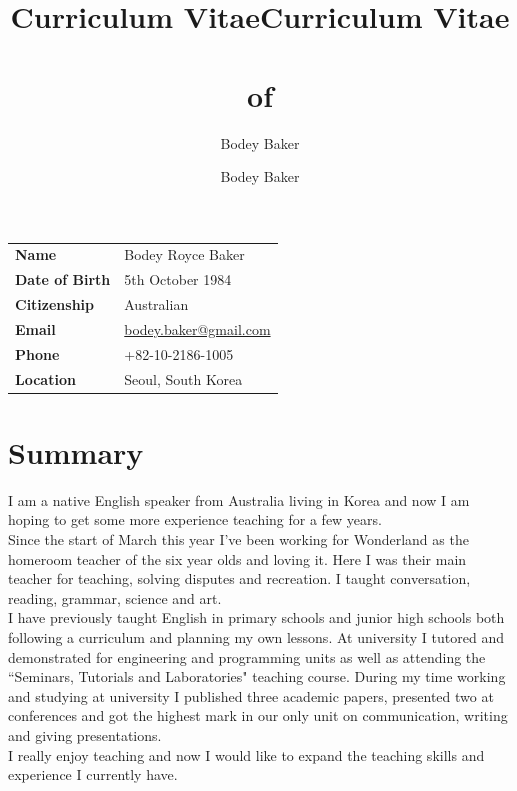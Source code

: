 \documentclass[10pt, a4paper]{report}
\title{Curriculum Vitae}
\author{Bodey Baker}
\title{Curriculum Vitae\\~\\of}
\author{Bodey Baker}%
\begin{document}
\begin{minipage}{13cm}
\begin{tabular}{ll}
{\bf Name} & Bodey Royce Baker \\ 
{\bf Date of Birth} & 5th October 1984 \\
{\bf Citizenship} & Australian \\
{\bf Email} & \href{mailto:bodey.baker@gmail.com}{bodey.baker@gmail.com} \\
{\bf Phone} & +82-10-2186-1005 \\
{\bf Location} & Seoul, South Korea \\
\end{tabular}
\section*{Summary}
I am a native English speaker from Australia living in Korea and now I am hoping to get some more experience teaching for a few years. \\

Since the start of March this year I've been working for Wonderland as the homeroom teacher of the six year olds and loving it. Here I was their main teacher for teaching, solving disputes and recreation. I taught conversation, reading, grammar, science and art. \\

I have previously taught English in primary schools and junior high schools both following a curriculum and planning my own lessons. At university I tutored and demonstrated for engineering and programming units as well as attending the ``Seminars, Tutorials and Laboratories" teaching course. During my time working and studying at university I published three academic papers, presented two at conferences and got the highest mark in our only unit on communication, writing and giving presentations. \\

I really enjoy teaching and now I would like to expand the teaching skills and experience I currently have.
\end{minipage}
\hfill
\begin{minipage}{50mm}
{%
\setlength{\fboxsep}{0pt}%
\setlength{\fboxrule}{1pt}%
%
}%
\end{minipage}
\end{document}
